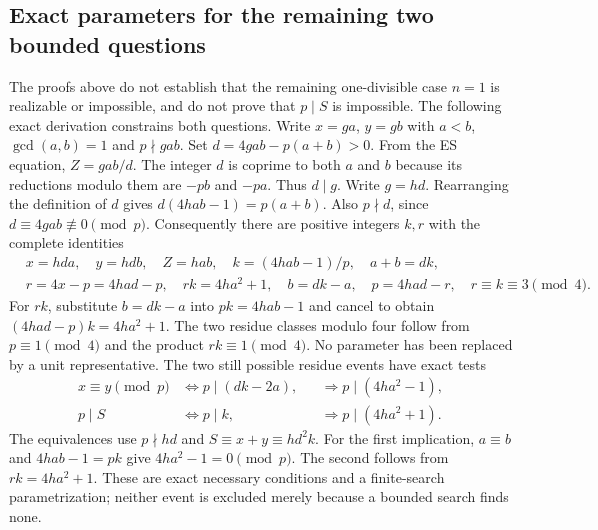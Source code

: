 \documentclass[11pt]{article}
\begin{document}
\subsection{Exact parameters for the remaining two bounded questions}
The proofs above do not establish that the remaining one-divisible
case $n=1$ is realizable or impossible, and do not prove that $p\mid S$
is impossible. The following exact derivation constrains both questions.
Write $x=g a$, $y=g b$ with $a<b$, $\gcd(a,b)=1$ and $p\nmid gab$.
Set $d=4gab-p(a+b)>0$. From the ES equation,
$Z=gab/d$. The integer $d$ is coprime to both $a$ and $b$ because
its reductions modulo them are $-pb$ and $-pa$. Thus $d\mid g$.
Write $g=hd$. Rearranging the definition of $d$ gives
$d(4hab-1)=p(a+b)$. Also $p\nmid d$, since
$d\equiv4gab\not\equiv0\pmod p$. Consequently there are positive
integers $k,r$ with the complete identities
\begin{equation}
 \begin{aligned}
 &x=hda,\quad y=hdb,\quad Z=hab,\quad
 k=(4hab-1)/p,\quad a+b=dk,\\
 &r=4x-p=4had-p,\quad rk=4ha^2+1,\quad
 b=dk-a,\quad p=4had-r,\quad r\equiv k\equiv3\pmod4.
 \end{aligned}                                         \tag{PES9}
\end{equation}
For $rk$, substitute $b=dk-a$ into $pk=4hab-1$ and cancel to obtain
$(4had-p)k=4ha^2+1$. The two residue classes modulo four follow
from $p\equiv1\pmod4$ and the product $rk\equiv1\pmod4$.
No parameter has been replaced by a unit representative.
The two still possible residue events have exact tests
\begin{equation}
 \begin{aligned}
 x\equiv y\pmod p
   &\Longleftrightarrow p\mid(dk-2a),
       &&\Longrightarrow p\mid(4ha^2-1),\\
 p\mid S
   &\Longleftrightarrow p\mid k,
       &&\Longrightarrow p\mid(4ha^2+1).
 \end{aligned}                                         \tag{PES10}
\end{equation}
The equivalences use $p\nmid hd$ and $S\equiv x+y\equiv hd^2k$.
For the first implication, $a\equiv b$ and $4hab-1=pk$ give
$4ha^2-1=0\pmod p$. The second follows from $rk=4ha^2+1$.
These are exact necessary conditions and a finite-search parametrization;
neither event is excluded merely because a bounded search finds none.
\end{document}
